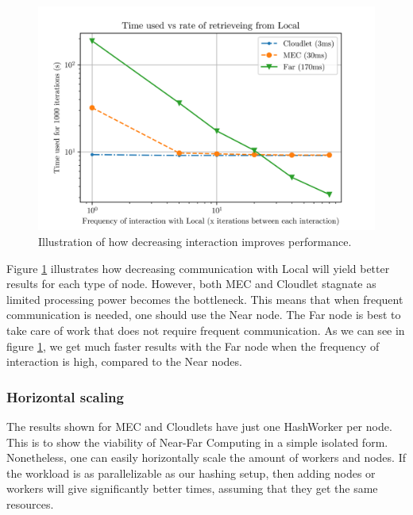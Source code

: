 \begin{figure}
    \centering
    \includegraphics{chapters/6_evaluation/figures/All_latency.png}
    \caption{Illustration of how decreasing interaction improves performance.}
    \label{fig:all_graph_decrease}
\end{figure}

Figure \ref{fig:all_graph_decrease} illustrates how decreasing communication with Local will yield better results for each type of node. However, both MEC and Cloudlet stagnate as limited processing power becomes the bottleneck. This means that when frequent communication is needed, one should use the Near node. The Far node is best to take care of work that does not require frequent communication. As we can see in figure \ref{fig:all_graph_decrease}, we get much faster results with the Far node when the frequency of interaction is high, compared to the Near nodes.





\subsubsection{Horizontal scaling}
The results shown for MEC and Cloudlets have just one HashWorker per node. This is to show the viability of Near-Far Computing in a simple isolated form. Nonetheless, one can easily horizontally scale the amount of workers and nodes. If the workload is as parallelizable as our hashing setup, then adding nodes or workers will give significantly better times, assuming that they get the same resources.


